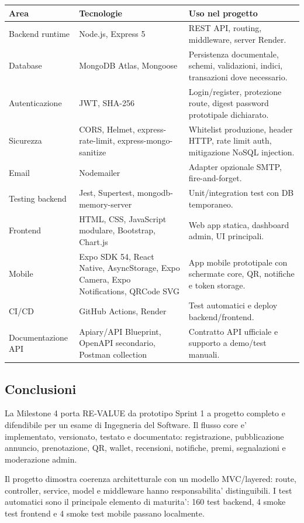 \documentclass[11pt,a4paper]{article}
\begin{document}
\begin{longtable}{L{3.2cm} L{4.6cm} L{7.2cm}}
\toprule
\textbf{Area} & \textbf{Tecnologie} & \textbf{Uso nel progetto} \\
\midrule
Backend runtime & Node.js, Express 5 & REST API, routing, middleware, server Render. \\
\midrule
Database & MongoDB Atlas, Mongoose & Persistenza documentale, schemi, validazioni, indici, transazioni dove necessario. \\
\midrule
Autenticazione & JWT, SHA-256 & Login/register, protezione route, digest password prototipale dichiarato. \\
\midrule
Sicurezza & CORS, Helmet, express-rate-limit, express-mongo-sanitize & Whitelist produzione, header HTTP, rate limit auth, mitigazione NoSQL injection. \\
\midrule
Email & Nodemailer & Adapter opzionale SMTP, fire-and-forget. \\
\midrule
Testing backend & Jest, Supertest, mongodb-memory-server & Unit/integration test con DB temporaneo. \\
\midrule
Frontend & HTML, CSS, JavaScript modulare, Bootstrap, Chart.js & Web app statica, dashboard admin, UI principali. \\
\midrule
Mobile & Expo SDK 54, React Native, AsyncStorage, Expo Camera, Expo Notifications, QRCode SVG & App mobile prototipale con schermate core, QR, notifiche e token storage. \\
\midrule
CI/CD & GitHub Actions, Render & Test automatici e deploy backend/frontend. \\
\midrule
Documentazione API & Apiary/API Blueprint, OpenAPI secondario, Postman collection & Contratto API ufficiale e supporto a demo/test manuali. \\
\bottomrule
\end{longtable}

\subsection{Conclusioni}

La Milestone 4 porta RE-VALUE da prototipo Sprint 1 a progetto completo e difendibile
per un esame di Ingegneria del Software. Il flusso core e' implementato, versionato,
testato e documentato: registrazione, pubblicazione annuncio, prenotazione, QR,
wallet, recensioni, notifiche, premi, segnalazioni e moderazione admin.

Il progetto dimostra coerenza architetturale con un modello MVC/layered: route,
controller, service, model e middleware hanno responsabilita' distinguibili. I test
automatici sono il principale elemento di maturita': 160 test backend, 4 smoke test
frontend e 4 smoke test mobile passano localmente.
\end{document}
